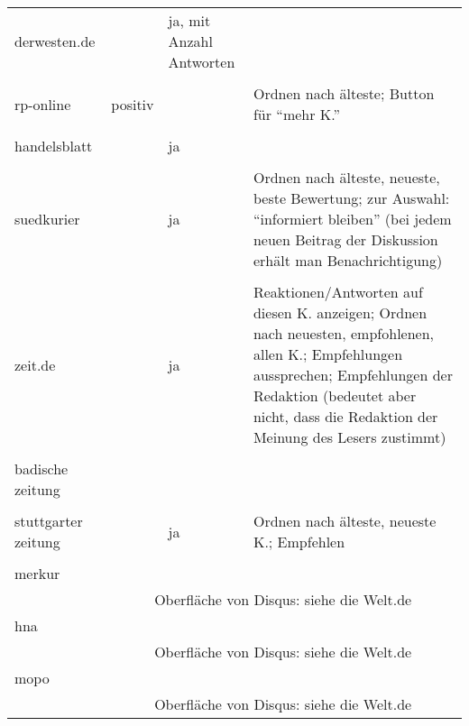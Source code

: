 \begin{landscape}
\begin{longtable}{l|p{40mm}p{40mm}p{80mm}}
  derwesten.de & & ja, mit Anzahl Antworten & \\
               & \multicolumn{3}{c}{}\\\hline

  rp-online & positiv & & Ordnen nach älteste; Button für ``mehr K.''\\
            & \multicolumn{3}{c}{}\\\hline

  handelsblatt & & ja & \\
               & \multicolumn{3}{c}{}\\\hline

  suedkurier & & ja &
    Ordnen nach älteste, neueste, beste Bewertung; zur Auswahl: ``informiert
    bleiben'' (bei jedem neuen Beitrag der Diskussion erhält man
    Benachrichtigung)\\
    & \multicolumn{3}{c}{}\\\hline

  zeit.de & & ja &
    Reaktionen/Antworten auf diesen K. anzeigen; Ordnen nach neuesten,
    empfohlenen, allen K.; Empfehlungen aussprechen; Empfehlungen der Redaktion
    (bedeutet aber nicht, dass die Redaktion der Meinung des Lesers zustimmt)\\
    & \multicolumn{3}{c}{}\\\hline

  badische zeitung & & & \\
                   & \multicolumn{3}{c}{} \\\hline

  stuttgarter zeitung & & ja & Ordnen nach älteste, neueste K.; Empfehlen\\
                      & \multicolumn{3}{c}{}\\\hline

  merkur &  & & \\
         & \multicolumn{3}{c}{Oberfläche von Disqus: siehe die Welt.de}\\\hline


  hna & & & \\
      & \multicolumn{3}{c}{Oberfläche von Disqus: siehe die Welt.de}\\\hline

  mopo & & & \\
         & \multicolumn{3}{c}{Oberfläche von Disqus: siehe die Welt.de}\\\hline


\end{longtable}
\end{landscape}
